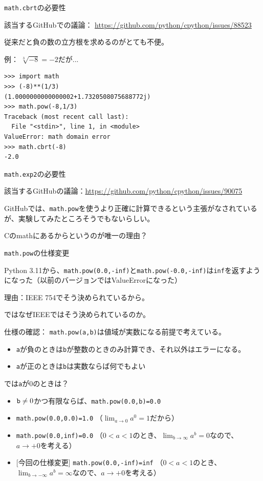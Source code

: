 \documentclass[unicode,lualatex,aspectratio=169]{beamer}
\begin{document}
\begin{frame}[fragile]{{\tt math.cbrt}の必要性}

    {\tiny 該当するGitHubでの議論： \url{https://github.com/python/cpython/issues/88523}}

  
  従来だと負の数の立方根を求めるのがとても不便。

  例：
  $\sqrt[3]{-8}=-2$だが...

{\fontsize{8pt}{8pt}\selectfont
\begin{verbatim}
>>> import math
>>> (-8)**(1/3)
(1.0000000000000002+1.7320508075688772j)
>>> math.pow(-8,1/3)
Traceback (most recent call last):
  File "<stdin>", line 1, in <module>
ValueError: math domain error
>>> math.cbrt(-8)
-2.0
\end{verbatim}
}
\end{frame}
\begin{frame}[fragile]{{\tt math.exp2}の必要性}
  
  {\tiny 該当するGitHubの議論：\url{https://github.com/python/cpython/issues/90075}}

  GitHubでは、\verb|math.pow|を使うより正確に計算できるという主張がなされているが、実験してみたところそうでもないらしい。

  Cのmathにあるからというのが唯一の理由？
\end{frame}
\begin{frame}[fragile]{{\tt math.pow}の仕様変更}
  
  Python 3.11から、\verb|math.pow(0.0,-inf)|と\verb|math.pow(-0.0,-inf)|は\verb|inf|を返すようになった（以前のバージョンではValueErrorになった）

  理由：IEEE 754でそう決められているから。

  ではなぜIEEEではそう決められているのか。
\end{frame}
\begin{frame}[fragile]
  仕様の確認：
  \verb|math.pow(a,b)|は値域が実数になる前提で考えている。
  \begin{itemize}
  \item \verb|a|が負のときは\verb|b|が整数のときのみ計算でき、それ以外はエラーになる。
  \item \verb|a|が正のときは\verb|b|は実数ならば何でもよい
  \end{itemize}

  では\verb|a|が0のときは？
  \begin{itemize}
  \item ${\tt b}\neq 0$かつ有限ならば、\verb|math.pow(0.0,b)=0.0|
  \item \verb|math.pow(0.0,0.0)=1.0| （$\lim_{a\to 0} a^0=1$だから）
  \item \verb|math.pow(0.0,inf)=0.0|
    （$0<a<1$のとき、$\lim_{b\to \infty} a^b=0$なので、$a\to +0$を考える）
  \item {[今回の仕様変更]} \verb|math.pow(0.0,-inf)=inf|
    （$0<a<1$のとき、$\lim_{b\to -\infty} a^b=\infty$なので、$a\to +0$を考える）
  \end{itemize}
\end{frame}
\end{document}
